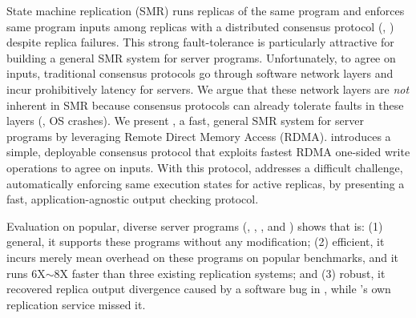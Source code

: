 

State machine replication (SMR) runs replicas of the same program and 
enforces same program inputs among replicas with a distributed consensus 
protocol (\eg, \paxos) despite replica failures. This strong 
fault-tolerance is particularly attractive for building a general SMR system 
for server programs. Unfortunately, to agree on inputs, traditional consensus 
protocols go through software network layers and incur prohibitively latency 
for servers. We argue that these network layers are \emph{not} inherent in SMR 
because consensus protocols can already tolerate faults in these layers (\eg, 
OS crashes). We present \xxx, a fast, general SMR system for 
server programs by leveraging Remote Direct Memory Access (RDMA). \xxx 
introduces a simple, deployable consensus protocol that exploits fastest RDMA 
one-sided write operations to agree on inputs. With this protocol, \xxx 
addresses a difficult challenge, automatically enforcing same execution states 
for active replicas, by presenting a fast, application-agnostic output checking 
protocol.

Evaluation on \nprog popular, diverse server programs (\eg, \memcached, \mysql, 
and \clamav) shows that \xxx is: (1) general, it supports these programs 
without any modification; (2) efficient, it incurs merely \overhead 
mean overhead on these programs on popular benchmarks, and it runs 6X$\sim$8X 
faster than three existing replication systems; and (3) robust, it 
recovered replica output divergence caused by a software bug in \redis, while 
\redis's own replication service missed it.


